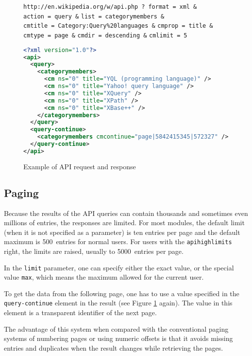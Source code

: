 \begin{figure}[htbp]
\texttt{http://en.wikipedia.org/w/api.php}~\texttt{?}\
\texttt{format}~\texttt{=}~\texttt{xml}~\texttt{\&}
\texttt{action}~\texttt{=}~\texttt{query}~\texttt{\&}
\texttt{list}~\texttt{=}~\texttt{categorymembers}~\texttt{\&}
\texttt{cmtitle}~\texttt{=}~\texttt{Category:Query\%20languages}~\texttt{\&}
\texttt{cmprop}~\texttt{=}~\texttt{title}~\texttt{\&}
\texttt{cmtype}~\texttt{=}~\texttt{page}~\texttt{\&}
\texttt{cmdir}~\texttt{=}~\texttt{descending}~\texttt{\&}
\texttt{cmlimit}~\texttt{=}~\texttt{5}

\begin{lstlisting}[language=xml]
<?xml version="1.0"?>
<api>
  <query>
    <categorymembers>
      <cm ns="0" title="YQL (programming language)" />
      <cm ns="0" title="Yahoo! query language" />
      <cm ns="0" title="XQuery" />
      <cm ns="0" title="XPath" />
      <cm ns="0" title="XBase++" />
    </categorymembers>
  </query>
  <query-continue>
    <categorymembers cmcontinue="page|5842415345|572327" />
  </query-continue>
</api>
\end{lstlisting}

\caption{Example of \ac{API} request and response}
\label{API example}
\end{figure}

\subsection{Paging}
\label{mw paging}

Because the results of the \ac{API} queries can contain thousands and sometimes even millions of entries,
the responses are limited.
For most modules, the default limit (when it is not specified as a parameter) is ten entries per page
and the default maximum is 500~entries for normal users.
For users with the \texttt{apihighlimits} right, the limits are raised, usually to 5000~entries per page.

In the \texttt{limit} parameter, one can specify either the exact value,
or the special value \texttt{max}, which means the maximum allowed for the current user.

To get the data from the following page, one has to use a value specified in the \texttt{query-continue}
element in the result (see Figure \ref{API example} again).
The value in this element is a transparent identifier of the next page.

The advantage of this system when compared with the conventional paging systems of numbering pages
or using numeric offsets is that it avoids missing entries and duplicates when the result
changes while retrieving the pages.

